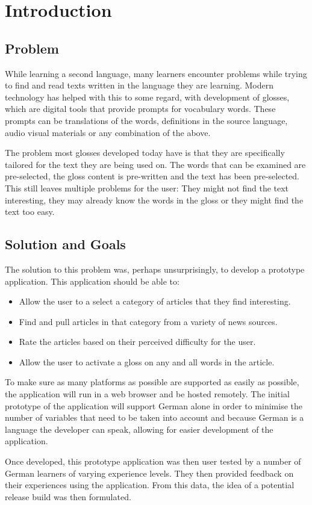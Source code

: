 \chapter{Introduction}

\section{Problem}
While learning a second language, many learners encounter problems while trying to find and read texts written in the language they are learning. Modern technology has helped with this to some regard, with development of glosses, which are digital tools that provide prompts for vocabulary words. These prompts can be translations of the words, definitions in the source language, audio visual materials or any combination of the above. 

The problem most glosses developed today have is that they are specifically tailored for the text they are being used on. The words that can be examined are pre-selected, the gloss content is pre-written and the text has been pre-selected. This still leaves multiple problems for the user: They might not find the text interesting, they may already know the words in the gloss or they might find the text too easy. 

\section{Solution and Goals}

The solution to this problem was, perhaps unsurprisingly, to develop a prototype application. This application should be able to:

\begin{itemize}
	\item Allow the user to a select a category of articles that they find interesting.
	
	\item Find and pull articles in that category from a variety of news sources.
	
	\item Rate the articles based on their perceived difficulty for the user.
	
	\item Allow the user to activate a gloss on any and all words in the article. 
\end{itemize}

To make sure as many platforms as possible are supported as easily as possible, the application will run in a web browser and be hosted remotely. The initial prototype of the application will support German alone in order to minimise the number of variables that need to be taken into account and because German is a language the developer can speak, allowing for easier development of the application.

Once developed, this  prototype application was then user tested by a number of German learners of varying experience levels. They then provided feedback on their experiences using the application. From this data, the idea of a potential release build was then formulated. 